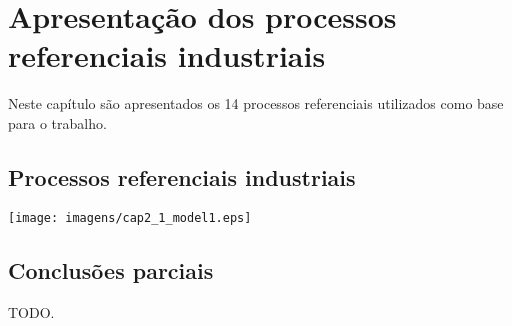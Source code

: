 \chapter{Apresentação dos processos referenciais industriais
    \label{cap:processos-referenciais}}

Neste capítulo são apresentados os 14 processos referenciais utilizados
como base para o trabalho.

\section{Processos referenciais industriais}

    \texttt{[image: imagens/cap2\_1\_model1.eps]}

\section{Conclusões parciais}

    TODO.
